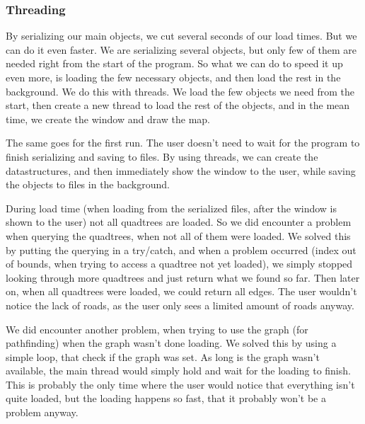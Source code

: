 \subsubsection{Threading}
By serializing our main objects, we cut several seconds of our load times. But we can do it 
even faster. We are serializing several objects, but only few of them are needed right from 
the start of the program. So what we can do to speed it up even more, is loading the few 
necessary objects, and then load the rest in the background. We do this with threads. 
We load the few objects we need from the start, then create a new thread to load the rest 
of the objects, and in the mean time, we create the window and draw the map.

The same goes for the first run. The user doesn't need to wait for the program to finish 
serializing and saving to files. By using threads, we can create the datastructures, and 
then immediately show the window to the user, while saving the objects to files in the 
background.

During load time (when loading from the serialized files, after the window is shown to the 
user) not all quadtrees are loaded. So we did encounter a problem when querying the 
quadtrees, when not all of them were loaded. We solved this by putting the querying in 
a try/catch, and when a problem occurred (index out of bounds, when trying to access a 
quadtree not yet loaded), we simply stopped looking through more quadtrees and just 
return what we found so far. Then later on, when all quadtrees were loaded, we could 
return all edges. The user wouldn't notice the lack of roads, as the user only sees a limited 
amount of roads anyway.

We did encounter another problem, when trying to use the graph (for pathfinding) when the 
graph wasn't done loading. We solved this by using a simple loop, that check if the graph was 
set. As long is the graph wasn't available, the main thread would simply hold and wait for the 
loading to finish. This is probably the only time where the user would notice that everything isn't 
quite loaded, but the loading happens so fast, that it probably won't be a problem anyway.
